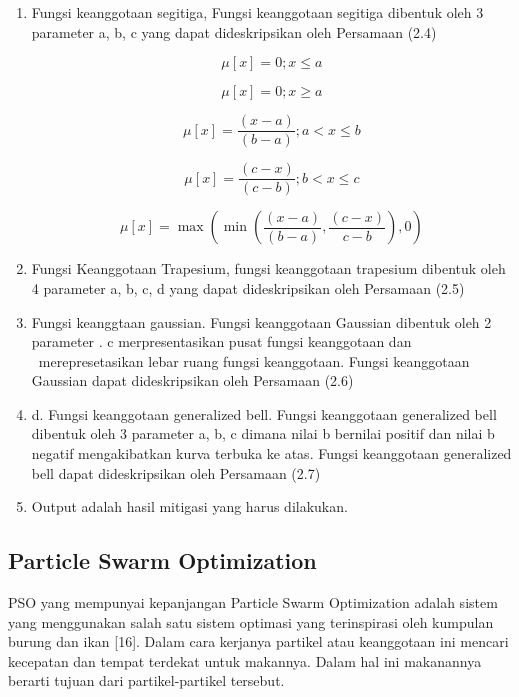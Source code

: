 \documentclass[11pt]{article}
\numberwithin{equation}{subsection}
\begin{document}
\begin{enumerate}[label=\alph*.]
	\item Fungsi keanggotaan segitiga, Fungsi  keanggotaan  segitiga dibentuk oleh 3 parameter  {a, b, c} yang dapat dideskripsikan oleh Persamaan (2.4)
	
	\begin{equation}
		\mu[x] = 0;x \leq a
	\end{equation}
	
	\begin{equation}
		\mu[x] = 0;x \geq a
	\end{equation}
	
	\begin{equation}
		\mu[x] = \frac{(x-a)}{(b-a)};a < x \leq b
	\end{equation}
	
	\begin{equation}
		\mu[x] = \frac{(c-x)}{(c-b)};b < x \leq c
	\end{equation}
	
	\begin{equation}
		\mu[x] = \max(\min(\frac{(x-a)}{(b-a)} , \frac{(c-x)}{c-b}), 0)
	\end{equation}
	
	\item Fungsi Keanggotaan Trapesium, fungsi keanggotaan trapesium dibentuk oleh 4 parameter {a, b, c, d} yang dapat dideskripsikan oleh Persamaan (2.5)
	\item Fungsi keanggtaan gaussian. Fungsi  keanggotaan  Gaussian  dibentuk  oleh  2  parameter .	c merpresentasikan pusat fungsi keanggotaan dan \ merepresetasikan lebar ruang fungsi  keanggotaan.
	Fungsi  keanggotaan  Gaussian  dapat  dideskripsikan  oleh Persamaan (2.6)
	\item d. Fungsi keanggotaan generalized bell. Fungsi keanggotaan generalized bell dibentuk oleh 3 parameter {a, b, c} dimana nilai b bernilai positif dan nilai b negatif mengakibatkan kurva terbuka ke atas.  Fungsi  keanggotaan  generalized  bell  dapat  dideskripsikan  oleh  Persamaan (2.7)
	\item Output adalah hasil mitigasi yang harus dilakukan.
\end{enumerate}

\subsection{Particle Swarm Optimization}
PSO yang mempunyai kepanjangan Particle Swarm Optimization adalah sistem yang menggunakan salah satu sistem optimasi yang terinspirasi oleh kumpulan burung dan ikan [16].
Dalam cara kerjanya partikel atau keanggotaan ini mencari kecepatan dan tempat terdekat untuk makannya.
Dalam hal ini makanannya berarti tujuan dari partikel-partikel tersebut. 
\end{document}
